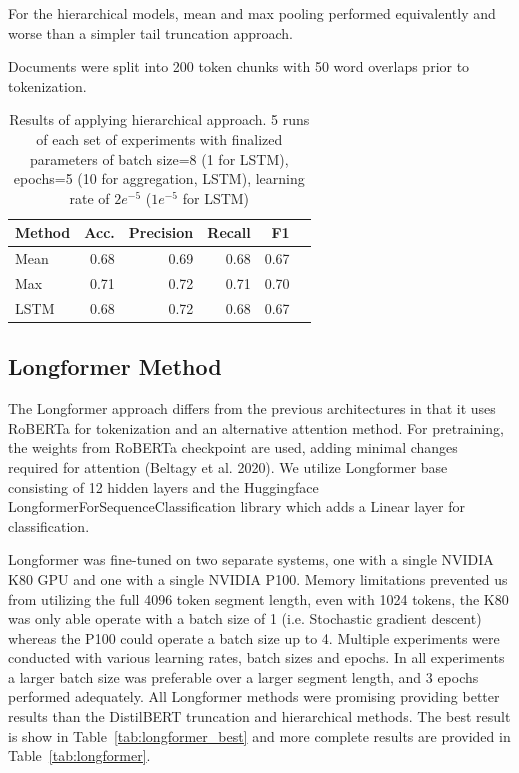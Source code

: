 \documentclass[twocolumn,10pt]{wmrDoc}
\begin{document}
For the hierarchical models, mean and max pooling performed equivalently and worse than a simpler tail truncation approach.

Documents were split into 200 token chunks with 50 word overlaps prior to tokenization. 

\begin{table}
 \caption{Results of applying hierarchical approach. 5 runs of each set of experiments with finalized parameters of batch size=8 (1 for LSTM), epochs=5 (10 for aggregation, LSTM), learning rate of $2e^{-5}$ ($1e^{-5}$ for LSTM)}
  \centering
  \begin{tabular}{lrrrrr}
    \toprule
    Method & Acc. & Precision & Recall & F1\\
    \midrule
    Mean & 0.68 & 0.69 & 0.68 & 0.67 \\
    Max & 0.71 & 0.72 & 0.71 & 0.70  \\
    LSTM & 0.68 & 0.72 & 0.68 & 0.67  \\
    \bottomrule
  \end{tabular}
  \label{tab:hierarchical}
\end{table}

\subsection{Longformer Method}
The Longformer approach differs from the previous architectures in that it uses RoBERTa for tokenization and an alternative attention method. For pretraining, the weights from RoBERTa \cite{roberta} checkpoint are used, adding minimal changes required for attention (Beltagy et al. 2020). We utilize Longformer base consisting of 12 hidden layers and the Huggingface LongformerForSequenceClassification library which adds a Linear layer for classification.

Longformer was fine-tuned on two separate systems, one with a single NVIDIA K80 GPU and one with a single NVIDIA P100. Memory limitations prevented us from utilizing the full 4096 token segment length, even with 1024 tokens, the K80 was only able operate with a batch size of 1 (i.e. Stochastic gradient descent) whereas the P100 could operate a batch size up to 4. Multiple experiments were conducted with various learning rates, batch sizes and epochs. In all experiments a larger batch size was preferable over a larger segment length, and 3 epochs performed adequately. All Longformer methods were promising providing better results than the DistilBERT truncation and hierarchical methods. The best result is show in Table~\ref{tab:longformer_best} and more complete results are provided in Table~\ref{tab:longformer}.
\end{document}
